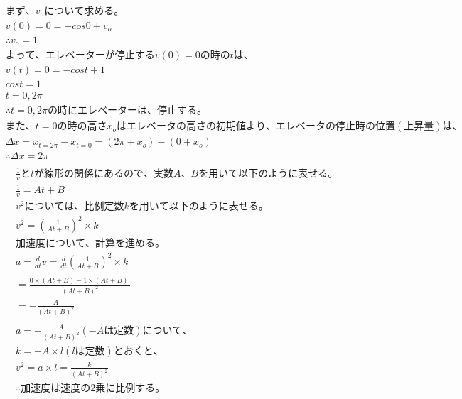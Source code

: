\documentclass[dvipdfmx,uplatex]{jsarticle}
\begin{document}
  \begin{equation}
    \begin{aligned}
      &まず、{v}_{o}について求める。\\
      &v(0) = 0 = -cos0 + {v}_{o}\nonumber\\
      &\therefore {v}_{o} = 1\nonumber\\
      &よって、エレベーターが停止するv(0) = 0の時のtは、\\
      &v(t) = 0 = -cost + 1\nonumber\\
      & cost = 1\nonumber\\
      &t = 0, 2\pi\nonumber\\
      &\therefore t = 0, 2\pi の時にエレベーターは、停止する。\\
      &また、t=0の時の高さ{x}_{o}はエレベータの高さの初期値より、エレベータの停止時の位置(上昇量)は、\\
      &\Delta x = {x}_{t=2\pi} -{x}_{t=0} = (2\pi + {x}_{o}) - (0 + {x}_{o})\nonumber\\
      &\therefore \Delta x = 2\pi\nonumber\\
    \end{aligned}
  \end{equation}
  \begin{equation}
    \begin{aligned}
      &\frac{1}{v}とtが線形の関係にあるので、実数A、Bを用いて以下のように表せる。\\
      &\frac{1}{v} = At + B\nonumber\\
      &v^2については、比例定数kを用いて以下のように表せる。\\
      &v^2 = \left( \frac{1}{At + B} \right)^2 \times k\nonumber\\
      &加速度について、計算を進める。\\
      &a = \frac{d}{dt}v = \frac{d}{dt} \left( \frac{1}{At + B} \right)^2 \times k\nonumber\\
      &= \frac{0 \times (At + B) -1 \times (At + B)^{\prime}}{(At + B)^2}\nonumber\\
      &= - \frac{A}{(At + B)^2}\nonumber\\
      &\\
      &a = - \frac{A}{(At + B)^2} (-Aは定数)について、\\
      &k = -A \times l (lは定数)とおくと、\\
      &v^2 = a \times l = \frac{k}{(At + B)^2}\nonumber\\
      &\therefore 加速度は速度の2乗に比例する。\\
    \end{aligned}
  \end{equation}
\end{document}
